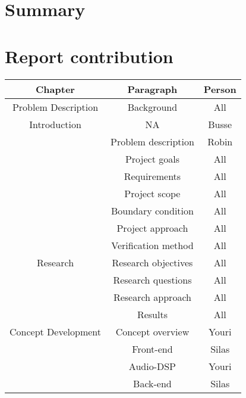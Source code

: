 \begin{justify}

\chapter*{Summary}


\newpage
\tableofcontents
\thispagestyle{empty}

\listoffigures
\thispagestyle{empty}

\listoftables
\thispagestyle{empty}

\newpage
\pagestyle{plain}

\chapter*{Report contribution}	%
\begin{longtable}{|c|c|c|}
	\hline
	\textbf{Chapter} & \textbf{Paragraph} & \textbf{Person} \\ \hline
	Problem Description			& Background					& All	 					\\ \hline
	Introduction				& NA							& Busse 					\\ \hline
								& Problem description			& Robin						\\ \hline
								& Project goals					& All						\\ \hline
								& Requirements					& All 						\\ \hline
								& Project scope					& All 						\\ \hline
								& Boundary condition			& All						\\ \hline
								& Project approach				& All						\\ \hline
								& Verification method			& All						\\ \hline
	Research 					& Research objectives			& All 						\\ \hline
								& Research questions			& All 						\\ \hline
								& Research approach				& All 						\\ \hline
								& Results						& All 						\\ \hline
	Concept Development 		& Concept overview				& Youri						\\ \hline
								& Front-end						& Silas						\\ \hline
								& Audio-DSP						& Youri						\\ \hline
								& Back-end						& Silas						\\ \hline

\end{longtable}
\end{justify}
